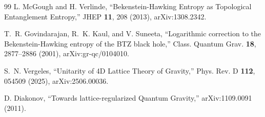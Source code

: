 \documentclass[aps,prd,twocolumn,showpacs,superscriptaddress,nofootinbib]{revtex4-2}
\begin{document}
\begin{thebibliography}{99}
L. McGough and H. Verlinde, ``Bekenstein-Hawking Entropy as
Topological Entanglement Entropy,'' JHEP \textbf{11}, 208 (2013),
arXiv:1308.2342.

T.~R. Govindarajan, R.~K. Kaul, and V. Suneeta, ``Logarithmic
correction to the Bekenstein-Hawking entropy of the BTZ black hole,''
Class. Quantum Grav. \textbf{18}, 2877--2886 (2001),
arXiv:gr-qc/0104010.

S.~N. Vergeles, ``Unitarity of 4D Lattice Theory of Gravity,''
Phys. Rev. D \textbf{112}, 054509 (2025), arXiv:2506.00036.

D. Diakonov, ``Towards lattice-regularized Quantum Gravity,''
arXiv:1109.0091 (2011).

\end{thebibliography}
\end{document}
